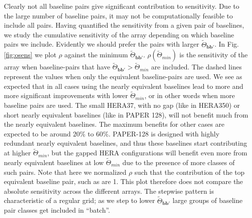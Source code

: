\documentclass[twocolumn,apj,numberedappendix]{emulateapj}
\renewcommand\[{\begin{equation}}
\renewcommand\]{\end{equation}}
\begin{document}
Clearly not all baseline pairs give significant contribution to sensitivity. Due to the large number of baseline pairs, it may not be computationally feasible to include all pairs. Having quantified the sensitivity from a given pair of baselines, we study the cumulative sensitivity of the array depending on which baseline pairs we include. Evidently we should prefer the pairs with larger $\widetilde{\Theta}_{\boldsymbol{bb'}}$. In Fig. \ref{fig:osens} we plot $\rho$ against the minimum $\widetilde{\Theta}_{\boldsymbol{bb'}}$. $\rho(\widetilde{\Theta}_{min})$ is the sensitivity of the array when baseline-pairs that have $\widetilde{\Theta}_{\boldsymbol{bb'}}>\widetilde{\Theta}_{min}$ are included. The dashed lines represent the values when only the equivalent baseline-pairs are used.  We see as expected that in all cases using the nearly equivalent baselines lead to more and more significant improvements with lower $\widetilde{\Theta}_{min}$, or in other words when more baseline pairs are used. The small HERA37, with no gap (like in HERA350) or short nearly equivalent baselines (like in PAPER 128), will not benefit much from the nearly equivalent baselines. The maximum benefits for other cases are expected to be around $20\%$ to $60\%$. PAPER-128 is designed with highly redundant nearly equivalent baselines, and thus  these baselines start contributing at higher $\widetilde{\Theta}_{min}$, but the gapped HERA configurations will benefit even more from nearly equivalent baselines at low $\widetilde{\Theta}_{min}$ due to the presence of more classes of such pairs. Note that here we normalized $\rho$ such that the contribution of the top equivalent baseline pair, such as are 1. This plot therefore does not compare the absolute sensitivity across the different arrays. The stepwise pattern is characteristic of a regular grid; as we step to lower $\widetilde{\Theta}_{\boldsymbol{bb'}}$ large groups of baseline pair classes get included in ``batch''. 
\end{document}
